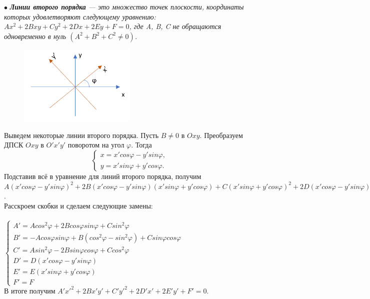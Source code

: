 \documentclass[a4paper, 12pt]{report}
\begin{document}
$\bullet$ \textit{\textbf{Линии второго порядка} --- это множество точек плоскости, координаты которых удовлетворяют следующему уравнению: $Ax^2 + 2Bxy + Cy^2 + 2Dx + 2Ey + F = 0$, где A, B, C не обращаются одновременно в нуль $(A^2 + B^2 + C^2 \neq 0)$.}\\
\begin{figure}
	\includegraphics[width=0.5\textwidth]{Л2П_1.PNG}
	\label{ris:image}
\end{figure}
Выведем некоторые линии второго порядка. Пусть $B \neq 0$ в $O{xy}$. Преобразуем ДПСК $O{xy}$ в $O'{x'y'}$ поворотом на угол $\varphi$. Тогда
$$ \begin{cases}
	x = x' cos\varphi - y' sin\varphi,\\
	y = x' sin\varphi + y' cos\varphi.
\end{cases}
$$
Подставив всё в уравнение для линий второго порядка, получим\\
$A(x'cos\varphi - y'sin\varphi)^2 + 2B(x' cos\varphi - y' sin\varphi)(x' sin\varphi + y' cos\varphi) + C(x' sin\varphi + y' cos\varphi)^2 + 2D(x' cos\varphi - y' sin\varphi) + 2E(x' sin\varphi + y' cos\varphi) + F = 0$.\\
Расскроем скобки и сделаем следующие замены:\\\\
$\begin{cases}
	A' = Acos^2\varphi + 2Bcos\varphi sin\varphi + Csin^2\varphi \\
	B' = -Acos\varphi sin\varphi + B(cos^2\varphi - sin^2\varphi) + Csin\varphi cos\varphi\\
	C' = Asin^2\varphi - 2Bsin\varphi cos\varphi + Ccos^2\varphi \\
	D' = D(x' cos\varphi - y' sin\varphi) \\
	E' = E(x' sin\varphi + y' cos\varphi) \\
	F' = F
\end{cases}$\\
В итоге получим $A'x'^2 + 2Bx'y' + C'y'^2 + 2D'x' + 2E'y' + F' = 0$.\\
\end{document}
